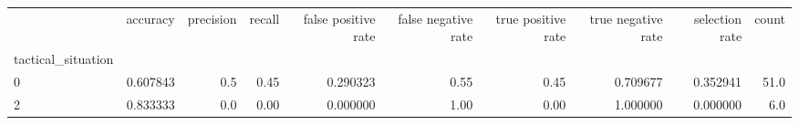 \begin{tabular}{lrrrrrrrrr}
\toprule
{} &  accuracy &  precision &  recall &  false positive rate &  false negative rate &  true positive rate &  true negative rate &  selection rate &  count \\
tactical\_situation &           &            &         &                      &                      &                     &                     &                 &        \\
\midrule
0                  &  0.607843 &        0.5 &    0.45 &             0.290323 &                 0.55 &                0.45 &            0.709677 &        0.352941 &   51.0 \\
2                  &  0.833333 &        0.0 &    0.00 &             0.000000 &                 1.00 &                0.00 &            1.000000 &        0.000000 &    6.0 \\
\bottomrule
\end{tabular}
